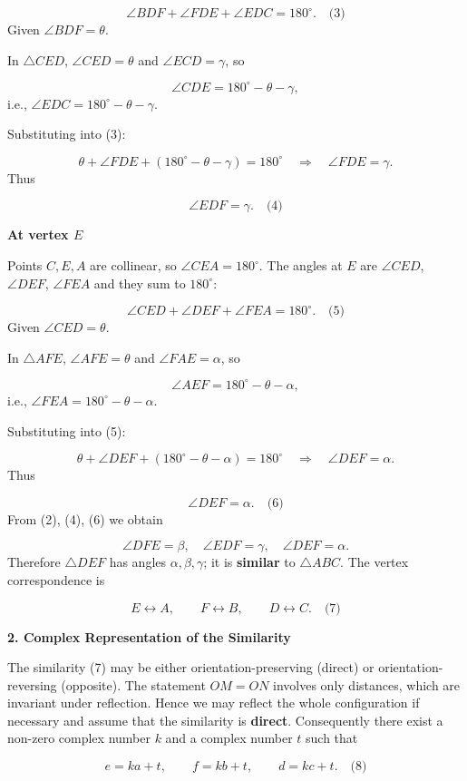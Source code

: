 \documentclass{llmxive}
\providecommand{\solutionheading}[1]{\par\smallskip\noindent\textbf{#1}\par}
\begin{document}
\[
\angle BDF + \angle FDE + \angle EDC = 180^\circ. \quad\text{(3)}
\]
Given \(\angle BDF = \theta\).\par
In \(\triangle CED\), \(\angle CED = \theta\) and \(\angle ECD = \gamma\), so\par
\[
\angle CDE = 180^\circ - \theta - \gamma,
\]
i.e., \(\angle EDC = 180^\circ - \theta - \gamma\).\par
Substituting into (3):\par
\[
\theta + \angle FDE + (180^\circ - \theta - \gamma) = 180^\circ \quad\Longrightarrow\quad \angle FDE = \gamma.
\]
Thus\par
\[
\angle EDF = \gamma. \quad\text{(4)}
\]
\solutionheading{At vertex \(E\)}
Points \(C,E,A\) are collinear, so \(\angle CEA = 180^\circ\). The angles at \(E\) are \(\angle CED\), \(\angle DEF\), \(\angle FEA\) and they sum to \(180^\circ\):\par
\[
\angle CED + \angle DEF + \angle FEA = 180^\circ. \quad\text{(5)}
\]
Given \(\angle CED = \theta\).\par
In \(\triangle AFE\), \(\angle AFE = \theta\) and \(\angle FAE = \alpha\), so\par
\[
\angle AEF = 180^\circ - \theta - \alpha,
\]
i.e., \(\angle FEA = 180^\circ - \theta - \alpha\).\par
Substituting into (5):\par
\[
\theta + \angle DEF + (180^\circ - \theta - \alpha) = 180^\circ \quad\Longrightarrow\quad \angle DEF = \alpha.
\]
Thus\par
\[
\angle DEF = \alpha. \quad\text{(6)}
\]
From (2), (4), (6) we obtain\par
\[
\angle DFE = \beta,\quad \angle EDF = \gamma,\quad \angle DEF = \alpha.
\]
Therefore \(\triangle DEF\) has angles \(\alpha,\beta,\gamma\); it is \textbf{similar} to \(\triangle ABC\). The vertex correspondence is\par
\[
E \longleftrightarrow A,\qquad F \longleftrightarrow B,\qquad D \longleftrightarrow C. \quad\text{(7)}
\]
\smallskip
\solutionheading{2. Complex Representation of the Similarity}
The similarity (7) may be either orientation-preserving (direct) or orientation-reversing (opposite). The statement \(OM = ON\) involves only distances, which are invariant under reflection. Hence we may reflect the whole configuration if necessary and assume that the similarity is \textbf{direct}. Consequently there exist a non-zero complex number \(k\) and a complex number \(t\) such that\par
\[
e = k a + t,\qquad f = k b + t,\qquad d = k c + t. \quad\text{(8)}
\]
\end{document}
